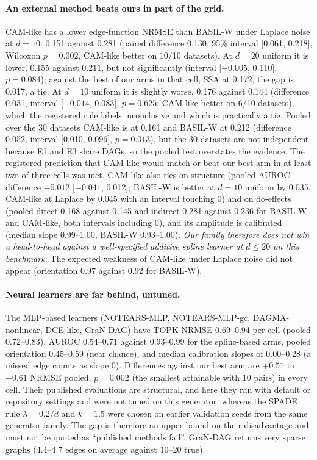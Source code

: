 \paragraph{An external method beats ours in part of the grid.} CAM-like has a lower edge-function NRMSE than BASIL-W under Laplace noise at $d=10$: 0.151 against 0.281 (paired difference 0.130, 95\% interval [0.061, 0.218], Wilcoxon $p=0.002$, CAM-like better on 10/10 datasets). At $d=20$ uniform it is lower, 0.155 against 0.211, but not significantly (interval [$-0.005$, 0.110], $p=0.084$); against the best of our arms in that cell, SSA at 0.172, the gap is 0.017, a tie. At $d=10$ uniform it is slightly worse, 0.176 against 0.144 (difference 0.031, interval [$-0.014$, 0.083], $p=0.625$; CAM-like better on 6/10 datasets), which the registered rule labels inconclusive and which is practically a tie. Pooled over the 30 datasets CAM-like is at 0.161 and BASIL-W at 0.212 (difference 0.052, interval [0.010, 0.096], $p=0.013$), but the 30 datasets are not independent because E1 and E3 share DAGs, so the pooled test overstates the evidence. The registered prediction that CAM-like would match or beat our best arm in at least two of three cells was met. CAM-like also ties on structure (pooled AUROC difference $-0.012$ [$-0.041$, 0.012]; BASIL-W is better at $d=10$ uniform by 0.035, CAM-like at Laplace by 0.045 with an interval touching 0) and on do-effects (pooled direct 0.168 against 0.145 and indirect 0.281 against 0.236 for BASIL-W and CAM-like, both intervals including 0), and its amplitude is calibrated (median slope 0.99--1.00, BASIL-W 0.93--1.00). \emph{Our family therefore does not win a head-to-head against a well-specified additive spline learner at $d\le20$ on this benchmark.} The expected weakness of CAM-like under Laplace noise did not appear (orientation 0.97 against 0.92 for BASIL-W).

\paragraph{Neural learners are far behind, untuned.} The MLP-based learners (NOTEARS-MLP, NOTEARS-MLP-gc, DAGMA-nonlinear, DCE-like, GraN-DAG) have TOPK NRMSE 0.69--0.94 per cell (pooled 0.72--0.83), AUROC 0.54--0.71 against 0.93--0.99 for the spline-based arms, pooled orientation 0.45--0.59 (near chance), and median calibration slopes of 0.00--0.28 (a missed edge counts as slope 0). Differences against our best arm are $+0.51$ to $+0.61$ NRMSE pooled, $p=0.002$ (the smallest attainable with 10 pairs) in every cell. Their published evaluations are structural, and here they ran with default or repository settings and were not tuned on this generator, whereas the SPADE rule $\lambda=0.2/d$ and $k=1.5$ were chosen on earlier validation seeds from the same generator family. The gap is therefore an upper bound on their disadvantage and must not be quoted as ``published methods fail''. GraN-DAG returns very sparse graphs (4.4--4.7 edges on average against 10--20 true).

